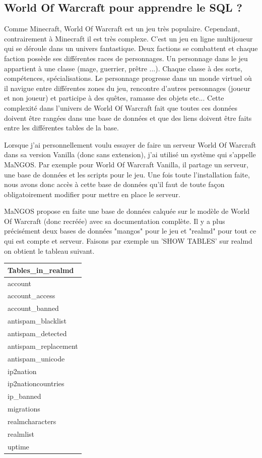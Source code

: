 \newpage

\subsection{World Of Warcraft pour apprendre le SQL ?}

Comme Minecraft, World Of Warcraft est un jeu très populaire. Cependant, contrairement à Minecraft il est très complexe. C'est un jeu en ligne multijoueur qui se déroule dans un univers fantastique. Deux factions se combattent et chaque faction possède ses différentes races de personnages. Un personnage dans le jeu appartient à une classe (mage, guerrier, prêtre ...). Chaque classe à des sorts, compétences, spécialisations. Le personnage progresse dans un monde virtuel où il navigue entre différentes zones du jeu, rencontre d'autres personnages (joueur et non joueur) et participe à des quêtes, ramasse des objets etc... Cette complexité dans l'univers de World Of Warcraft fait que toutes ces données doivent être rangées dans une base de données et que des liens doivent être faits entre les différentes tables de la base.

Lorsque j'ai personnellement voulu essayer de faire un serveur World Of Warcraft dans sa version Vanilla (donc sans extension), j'ai utilisé un système qui s'appelle MaNGOS. \cite{61} \cite{62} Par exemple pour World Of Warcraft Vanilla, il partage un serveur, une base de données et les scripts pour le jeu. Une fois toute l'installation faite, nous avons donc accès à cette base de données qu'il faut de toute façon obligatoirement modifier pour mettre en place le serveur.

MaNGOS propose en faite une base de données calquée sur le modèle de World Of Warcraft (donc recréée) avec sa documentation complète. \cite{63} Il y a plus précisément deux bases de données "mangos" pour le jeu et "realmd" pour tout ce qui est compte et serveur. Faisons par exemple un 'SHOW TABLES' sur realmd on obtient le tableau suivant.

\begin{table}[!htb]
\centering
\begin{tabular}{|l|}
\hline
Tables\_in\_realmd    \\ \hline
account               \\
account\_access       \\
account\_banned       \\
antispam\_blacklist   \\
antispam\_detected    \\
antispam\_replacement \\
antispam\_unicode     \\
ip2nation             \\
ip2nationcountries    \\
ip\_banned            \\
migrations            \\
realmcharacters       \\
realmlist             \\
uptime                \\ \hline
\end{tabular}
\end{table}

